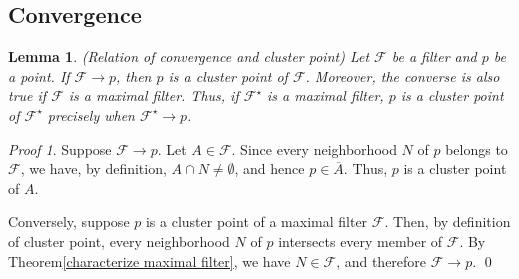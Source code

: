 \documentclass[a4paper,12pt]{article}
\newtheorem{lem}[thm]{Lemma}
\theoremstyle{remark}
\newtheorem*{prf}{Proof}
\theoremstyle{definition}
\theoremstyle{definition}
\theoremstyle{definition}
\begin{document}
\subsection{Convergence}

\begin{lem}\label{Relation of convergence and cluster point} (Relation of convergence and cluster point)
	Let \( \mathscr{F} \) be a filter and \( p \) be a point.
	If \( \mathscr{F}\to p \), then \( p \) is a cluster point of \( \mathscr{F} \).
	Moreover, the converse is also true if \( \mathscr{F} \) is a maximal filter.
	Thus, if \( \mathscr{F}^{\star} \) is a maximal filter, \( p \) is a cluster point of \( \mathscr{F}^{\star} \) precisely when \( \mathscr{F}^{\star} \to p\).
\end{lem}
\begin{prf}
	Suppose \( \mathscr{F} \to p \). Let \( A \in \mathscr{F} \).
	Since every neighborhood \( N \) of \( p \) belongs to \( \mathscr{F} \), we have, by definition, \( A \cap N \neq \emptyset \), and hence \( p \in \overline{A} \). Thus, \( p \) is a cluster point of \( A \).

	Conversely, suppose \( p \) is a cluster point of a maximal filter \( \mathscr{F} \). Then, by definition of cluster point, every neighborhood \( N \) of \( p \) intersects every member of \( \mathscr{F} \). By Theorem\ref{characterize maximal filter}, we have \( N \in \mathscr{F} \), and therefore \( \mathscr{F} \to p \).
	\qed\end{prf}
\end{document}
